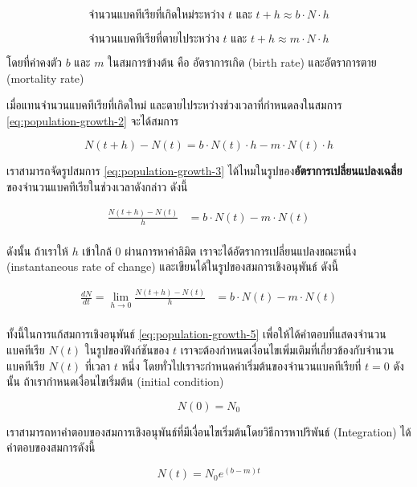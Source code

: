 \documentclass[
]{book}
\theoremstyle{definition}
\theoremstyle{definition}
\theoremstyle{definition}
\theoremstyle{definition}
\theoremstyle{remark}
\begin{document}
\[
\text{จำนวนแบคทีเรียที่เกิดใหม่ระหว่าง } t \text{ และ } t + h \approx b \cdot N \cdot h
\]

\[
\text{จำนวนแบคทีเรียที่ตายไประหว่าง } t \text{ และ } t + h \approx m \cdot N \cdot h
\]

โดยที่ค่าคงตัว \(b\) และ \(m\) ในสมการข้างต้น คือ อัตราการเกิด (birth rate) และอัตราการตาย (mortality rate)

เมื่อแทนจำนวนแบคทีเรียที่เกิดใหม่ และตายไประหว่างช่วงเวลาที่กำหนดลงในสมการ \eqref{eq:population-growth-2} จะได้สมการ

\begin{equation}
N(t + h) - N(t) = b\cdot N(t) \cdot h - m\cdot N(t) \cdot h
\label{eq:population-growth-3}
\end{equation}

เราสามารถจัดรูปสมการ \eqref{eq:population-growth-3} ได้ไหมในรูปของ\textbf{อัตราการเปลี่ยนแปลงเฉลี่ย}ของจำนวนแบคทีเรียในช่วงเวลาดังกล่าว ดังนี้

\begin{align}
\frac{N(t + h) - N(t)}{h} &= b\cdot N(t)  - m\cdot N(t)\\
\label{eq:population-growth-4}
\end{align}

ดังนั้น ถ้าเราให้ \(h\) เข้าใกล้ 0 ผ่านการหาค่าลิมิต เราจะได้อัตราการเปลี่ยนแปลงขณะหนึ่ง (instantaneous rate of change) และเขียนได้ในรูปของสมการเชิงอนุพันธ์ ดังนี้

\begin{align}
\frac{dN}{dt} = \lim_{h \rightarrow 0}\frac{N(t + h) - N(t)}{h} &= b\cdot N(t)  - m\cdot N(t)\\
\label{eq:population-growth-5}
\end{align}

ทั้งนี้ในการแก้สมการเชิงอนุพันธ์ \eqref{eq:population-growth-5} เพื่อให้ได้คำตอบที่แสดงจำนวนแบคทีเรีย \(N(t)\) ในรูปของฟังก์ชันของ \(t\) เราจะต้องกำหนดเงื่อนไขเพิ่มเติมที่เกี่ยวข้องกับจำนวนแบคทีเรีย \(N(t)\) ที่เวลา \(t\) หนึ่ง โดยทั่วไปเราจะกำหนดค่าเริ่มต้นของจำนวนแบคทีเรียที่ \(t = 0\) ดังนั้น ถ้าเรากำหนดเงื่อนไขเริ่มต้น (initial condition)

\begin{equation}
N(0) = N_0
\label{eq:population-growth-6}
\end{equation}

เราสามารถหาคำตอบของสมการเชิงอนุพันธ์ที่มีเงื่อนไขเริ่มต้นโดยวิธีการหาปริพันธ์ (Integration) ได้คำตอบของสมการดังนี้

\begin{equation}
N(t) = N_0 e^{(b-m)t}
\label{eq:population-growth-7}
\end{equation}
\end{document}
